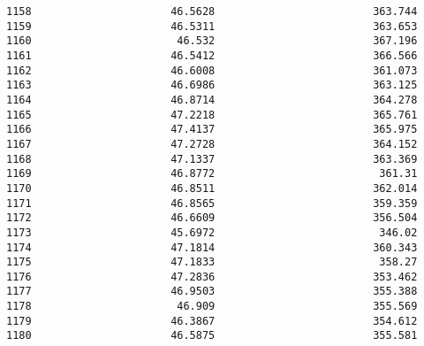 \documentclass[11pt]{article}
\begin{document}
\begin{tcolorbox}[breakable, size=fbox, boxrule=.5pt, pad at break*=1mm, opacityfill=0]
\begin{Verbatim}[commandchars=\\\{\}]
1158                      46.5628                         363.744
1159                      46.5311                         363.653
1160                       46.532                         367.196
1161                      46.5412                         366.566
1162                      46.6008                         361.073
1163                      46.6986                         363.125
1164                      46.8714                         364.278
1165                      47.2218                         365.761
1166                      47.4137                         365.975
1167                      47.2728                         364.152
1168                      47.1337                         363.369
1169                      46.8772                          361.31
1170                      46.8511                         362.014
1171                      46.8565                         359.359
1172                      46.6609                         356.504
1173                      45.6972                          346.02
1174                      47.1814                         360.343
1175                      47.1833                          358.27
1176                      47.2836                         353.462
1177                      46.9503                         355.388
1178                       46.909                         355.569
1179                      46.3867                         354.612
1180                      46.5875                         355.581


\end{Verbatim}
\end{tcolorbox}
\end{document}
